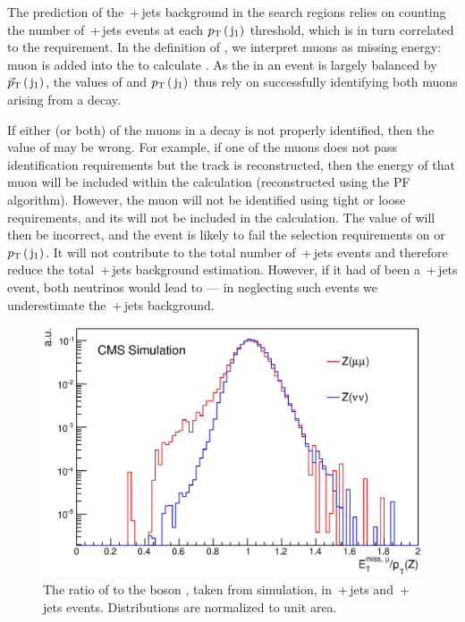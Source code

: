 The prediction of the \znunubr{}\,+\,jets background in the search regions relies on counting the number of 
\zmumubr\,+\,jets events at each $p_{\text{T}}\,(\,\mathrm{j}_1)$ threshold, which is in turn
correlated to the \METmu requirement.
In the definition of \METmu, we interpret muons as missing energy: 
muon \ptv is added into the \METv to calculate \METvmu.
As the \METvmu in an event is largely balanced by $\vec{p}_{\text{T}}\,(\,\mathrm{j}_1)$, 
the values of \METmu and $p_{\text{T}}\,(\,\mathrm{j}_1)$ thus rely on successfully 
identifying both muons arising from a \zmumu decay. 

If either (or both) of the muons in a \zmumu decay is not properly identified, 
then the value of \METmu may be wrong.
For example, if one of the muons does not pass identification requirements but the track is reconstructed, 
then the energy of that muon will be included within the \METv calculation (reconstructed using the \ac{PF} algorithm).
However, the muon will not be identified using tight or loose requirements, and its \ptv will not be included in the \METvmu calculation.
The value of \METvmu will then be incorrect, 
and the event is likely to fail the selection requirements on \METmu or $p_{\text{T}}\,(\,\mathrm{j}_1)$.
%
It will not contribute to the total number of \zmumubr\,+\,jets events and therefore reduce the total \znunubr\,+\,jets background estimation.
However, if it had of been a \znunubr\,+\,jets event, 
both neutrinos would lead to \MET --- in neglecting such events we underestimate the \znunubr\,+\,jets background.


\begin{figure}%
  \begin{center}
  \includegraphics[scale=0.55]     {Figures/sus13009/ratioMETnoMu_GenZpT.eps}
   \caption{The ratio of \METmu to the \Z{} boson \pt, taken from simulation, in \zmumubr\,+\,jets and \znunubr\,+\,jets events. Distributions are normalized to unit area.
         \label{fig:metratio}}
  \end{center}
\end{figure}

